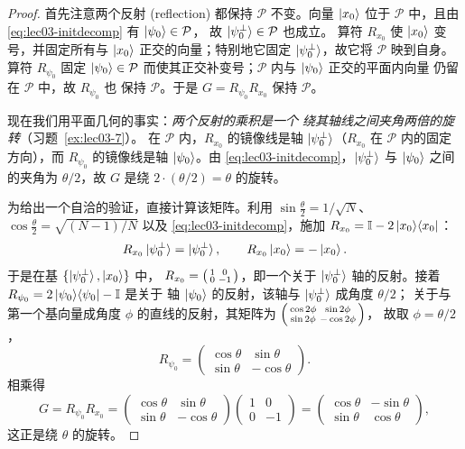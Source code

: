 \begin{proof}
首先注意两个反射 (reflection) 都保持 $\mathcal{P}$ 不变。向量 $\ket{x_0}$
位于 $\mathcal{P}$ 中，且由 \eqref{eq:lec03-initdecomp} 有 $\ket{\psi_0}\in\mathcal{P}$，
故 $\ket{\psi_0^{\perp}}\in\mathcal{P}$ 也成立。
算符 $R_{x_0}$ 使 $\ket{x_0}$ 变号，并固定所有与
$\ket{x_0}$ 正交的向量；特别地它固定 $\ket{\psi_0^{\perp}}$，故它将
$\mathcal{P}$ 映到自身。算符 $R_{\psi_0}$ 固定 $\ket{\psi_0}\in\mathcal P$
而使其正交补变号；$\mathcal P$ 内与 $\ket{\psi_0}$ 正交的平面内向量
仍留在 $\mathcal P$ 中，故 $R_{\psi_0}$ 也
保持 $\mathcal{P}$。于是 $G=R_{\psi_0}R_{x_0}$ 保持 $\mathcal{P}$。

现在我们用平面几何的事实：\emph{两个反射的乘积是一个
绕其轴线之间夹角两倍的旋转}（习题~\ref{ex:lec03-7}）。
在 $\mathcal P$ 内，$R_{x_0}$ 的镜像线是轴
$\ket{\psi_0^{\perp}}$（$R_{x_0}$ 在 $\mathcal P$ 内的固定方向），而
$R_{\psi_0}$ 的镜像线是轴 $\ket{\psi_0}$。由
\eqref{eq:lec03-initdecomp}，$\ket{\psi_0^{\perp}}$ 与 $\ket{\psi_0}$ 之间
的夹角为 $\theta/2$，故 $G$ 是绕 $2\cdot(\theta/2)=\theta$ 的旋转。

为给出一个自洽的验证，直接计算该矩阵。利用
$\sin\tfrac{\theta}{2}=1/\sqrt N$、$\cos\tfrac{\theta}{2}=\sqrt{(N-1)/N}$ 以及
\eqref{eq:lec03-initdecomp}，施加 $R_{x_0}=\mathbb{I}-2\ket{x_0}\!\bra{x_0}$：
\[
  R_{x_0}\ket{\psi_0^{\perp}}=\ket{\psi_0^{\perp}},
  \qquad
  R_{x_0}\ket{x_0}=-\ket{x_0}.
\]
于是在基 $\{\ket{\psi_0^{\perp}},\ket{x_0}\}$ 中，
$R_{x_0}=\begin{psmallmatrix}1&0\\0&-1\end{psmallmatrix}$，即一个关于
$\ket{\psi_0^{\perp}}$ 轴的反射。接着 $R_{\psi_0}=2\ket{\psi_0}\!\bra{\psi_0}-\mathbb{I}$ 是关于
轴 $\ket{\psi_0}$ 的反射，该轴与 $\ket{\psi_0^{\perp}}$ 成角度 $\theta/2$；
关于与第一个基向量成角度 $\phi$ 的直线的反射，其矩阵为
$\begin{psmallmatrix}\cos2\phi&\sin2\phi\\\sin2\phi&-\cos2\phi\end{psmallmatrix}$，
故取 $\phi=\theta/2$，
\[
  R_{\psi_0}=\begin{pmatrix}\cos\theta&\sin\theta\\ \sin\theta&-\cos\theta\end{pmatrix}.
\]
相乘得
\[
  G=R_{\psi_0}R_{x_0}
   =\begin{pmatrix}\cos\theta&\sin\theta\\ \sin\theta&-\cos\theta\end{pmatrix}
    \begin{pmatrix}1&0\\0&-1\end{pmatrix}
   =\begin{pmatrix}\cos\theta&-\sin\theta\\ \sin\theta&\cos\theta\end{pmatrix},
\]
这正是绕 $\theta$ 的旋转。
\end{proof}

